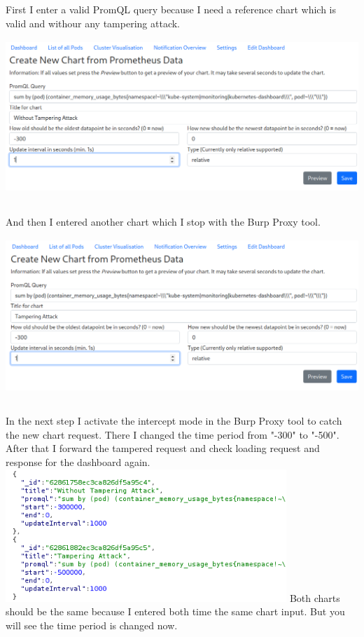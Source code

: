 First I enter a valid PromQL query because I need a reference chart which is valid and withour any tampering attack. \newline
\includegraphics[height=6.5cm]{resources/tampering-without-attack.png}

And then I entered another chart which I stop with the Burp Proxy tool. \newline
\includegraphics[height=6.5cm]{resources/tampering-attack.png}

In the next step I activate the intercept mode in the Burp Proxy tool to catch the new chart request. There I changed the time period from "-300" to "-500". After that I forward the tampered request and check loading request and response for the dashboard again. \newline
\includegraphics[height=5cm]{resources/tampering-successful-2.png} \newline
Both charts should be the same because I entered both time the same chart input. But you will see the time period is changed now.

